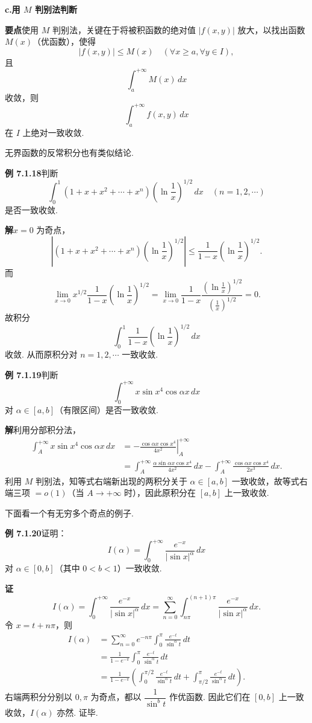 \documentclass[UTF8, 12pt, fontset=fandol, oneside]{ctexart}
\begin{document}
\noindent\textbf{c.\quad 用 $M$ 判别法判断}

\noindent\textbf{要点}\quad 使用 $M$ 判别法，关键在于将被积函数的绝对值 $|f(x,y)|$ 放大，以找出函数 $M(x)$（优函数），使得
\[
|f(x,y)|\le M(x)\quad(\forall x\ge a,\forall y\in I),
\]
且
\[
\int_a^{+\infty}M(x)\,dx
\]
收敛，则
\[
\int_a^{+\infty}f(x,y)\,dx
\]
在 $I$ 上绝对一致收敛.

无界函数的反常积分也有类似结论.

\noindent\textbf{例 7.1.18}\quad 判断
\[
\int_0^1(1+x+x^2+\cdots+x^n)\left(\ln\frac1x\right)^{1/2}\,dx
\quad(n=1,2,\cdots)
\]
是否一致收敛.

\noindent\textbf{解}\quad $x=0$ 为奇点，
\[
\left|(1+x+x^2+\cdots+x^n)\left(\ln\frac1x\right)^{1/2}\right|
\le\frac1{1-x}\left(\ln\frac1x\right)^{1/2}.
\]
而
\[
\lim_{x\to0}x^{1/2}\frac1{1-x}\left(\ln\frac1x\right)^{1/2}
=\lim_{x\to0}\frac1{1-x}\frac{\left(\ln\frac1x\right)^{1/2}}{\left(\frac1x\right)^{1/2}}
=0.
\]
故积分
\[
\int_0^1\frac1{1-x}\left(\ln\frac1x\right)^{1/2}\,dx
\]
收敛. 从而原积分对 $n=1,2,\cdots$ 一致收敛.

\noindent\textbf{例 7.1.19}\quad 判断
\[
\int_0^{+\infty}x\sin x^4\cos\alpha x\,dx
\]
对 $\alpha\in[a,b]$（有限区间）是否一致收敛.

\noindent\textbf{解}\quad 利用分部积分法，
\[
\begin{aligned}
\int_A^{+\infty}x\sin x^4\cos\alpha x\,dx
&=-\left.\frac{\cos\alpha x\cos x^4}{4x^2}\right|_A^{+\infty}\\
&=\int_A^{+\infty}\frac{\alpha\sin\alpha x\cos x^4}{4x^2}\,dx
-\int_A^{+\infty}\frac{\cos\alpha x\cos x^4}{2x^3}\,dx.
\end{aligned}
\]
利用 $M$ 判别法，知等式右端新出现的两积分关于 $\alpha\in[a,b]$ 一致收敛，故等式右端三项 $=o(1)$（当 $A\to+\infty$ 时），因此原积分在 $[a,b]$ 上一致收敛.

下面看一个有无穷多个奇点的例子.

\noindent\textbf{例 7.1.20}\quad 证明：
\[
I(\alpha)=\int_0^{+\infty}\frac{e^{-x}}{|\sin x|^\alpha}\,dx
\]
对 $\alpha\in[0,b]$（其中 $0<b<1$）一致收敛.

\noindent\textbf{证}\quad
\[
I(\alpha)=\int_0^{+\infty}\frac{e^{-x}}{|\sin x|^\alpha}\,dx
=\sum_{n=0}^{\infty}\int_{n\pi}^{(n+1)\pi}\frac{e^{-x}}{|\sin x|^\alpha}\,dx.
\]
令 $x=t+n\pi$，则
\[
\begin{aligned}
I(\alpha)
&=\sum_{n=0}^{\infty}e^{-n\pi}\int_0^\pi\frac{e^{-t}}{\sin^\alpha t}\,dt\\
&=\frac1{1-e^{-\pi}}\int_0^\pi\frac{e^{-t}}{\sin^\alpha t}\,dt\\
&=\frac1{1-e^{-\pi}}\left(\int_0^{\pi/2}\frac{e^{-t}}{\sin^\alpha t}\,dt
+\int_{\pi/2}^{\pi}\frac{e^{-t}}{\sin^\alpha t}\,dt\right).
\end{aligned}
\]
右端两积分分别以 $0,\pi$ 为奇点，都以 $\dfrac1{\sin^bt}$ 作优函数. 因此它们在 $[0,b]$ 上一致收敛，$I(\alpha)$ 亦然. 证毕.
\end{document}
